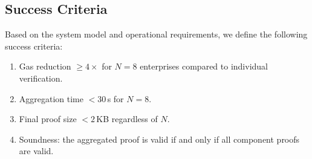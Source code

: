 \subsection{Success Criteria}

Based on the system model and operational requirements, we define the
following success criteria:

\begin{enumerate}
  \item Gas reduction $\geq 4\times$ for $N{=}8$ enterprises compared
    to individual verification.
  \item Aggregation time $< 30$\,s for $N{=}8$.
  \item Final proof size $< 2$\,KB regardless of $N$.
  \item Soundness: the aggregated proof is valid if and only if all
    component proofs are valid.
\end{enumerate}
